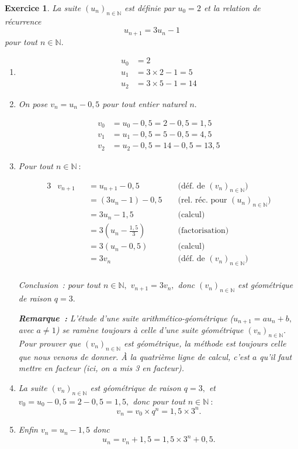 \documentclass[10pt]{article}
\newtheorem{exo}{Exercice}
\begin{document}
\begin{exo}

La suite $(u_n)_{n\in\mathbb{N}}$ est définie par $u_0=2$ et la relation de récurrence \[u_{n+1}=3 u_n-1\] pour tout $n\in\mathbb{N}.$


\begin{enumerate}
\item \begin{align*}
u_0&=2\\
u_1&=3\times 2-1=5\\
u_2&=3\times 5-1=14
\end{align*}

\item On pose $v_n=u_n-0,5$ pour tout entier naturel $n.$

\begin{align*}
v_0&=u_0-0,5=2-0,5=1,5\\
v_1&=u_1-0,5=5-0,5=4,5\\
v_2&=u_2-0,5=14-0,5=13,5
\end{align*}
\item Pour tout $n\in\mathbb{N}~:$



\begin{alignat*}{3}
&v_{n+1}&& =u_{n+1}-0,5 && \text{  (déf. de } (v_n)_{n\in\mathbb{N}})\\
& && =(3u_n-1)-0,5 && \text{  (rel. réc. pour } (u_n)_{n\in\mathbb{N}})\\
& && =3u_n-1,5 && \text{  (calcul)}\\
& && =3\left(u_n-\frac{1,5}{3}\right) && \text{  (factorisation)}\\
& && =3(u_n-0,5) && \text{  (calcul)}\\
& && =3v_n&& \text{  (déf. de } (v_n)_{n\in\mathbb{N}})\\
\end{alignat*}


Conclusion~: pour tout $n\in\mathbb{N},$ $v_{n+1}=3v_n,$
donc $(v_n)_{n\in\mathbb{N}}$ est géométrique de raison $q=3.$

\medskip

\textbf{Remarque~:} L'étude d'une suite arithmético-géométrique ($u_{n+1}=au_n+b,$ avec $a\not=1$) se ramène toujours à celle d'une suite géométrique $(v_n)_{n\in\mathbb{N}}.$ Pour prouver que $(v_n)_{n\in\mathbb{N}}$ est géométrique, la méthode est toujours celle que nous venons de donner. \`A la quatrième ligne de calcul, c'est $a$ qu'il faut mettre  en facteur (ici, on a mis 3 en facteur).

\item La suite $(v_n)_{n\in\mathbb{N}}$ est géométrique de raison $q=3,$ et  $v_0=u_0-0,5=2-0,5=1,5,$ donc pour tout $n\in\mathbb{N}~:$
\[v_n=v_0\times q^n=1,5\times 3^n.\]
\item Enfin $v_n=u_n-1,5$ donc
\[u_n=v_n+1,5=1,5\times 3^n+0,5.\]
\end{enumerate}

\end{exo}
\end{document}
